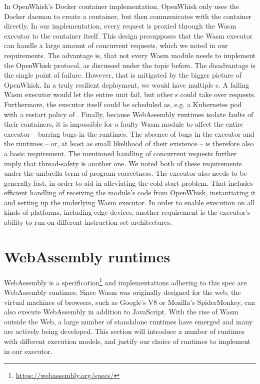 
In OpenWhisk's Docker container implementation, OpenWhisk only uses the Docker daemon to create a container, but then communicates with the container directly. In our implementation, every request is proxied through the Wasm executor to the container itself. This design presupposes that the Wasm executor can handle a large amount of concurrent requests, which we noted in our requirements. The advantage is, that not every Wasm module needs to implement the OpenWhisk protocol, as discussed under the  topic before. The disadvantage is the single point of failure. However, that is mitigated by the bigger picture of OpenWhisk. In a truly resilient deployment, we would have multiple s. A failing Wasm executor would let the entire  unit fail, but other s could take over requests. Furthermore, the executor itself could be scheduled as, e.g. a Kubernetes pod with a restart policy of . Finally, because WebAssembly runtimes isolate faults of their containers, it is impossible for a faulty Wasm module to affect the entire executor -- barring bugs in the runtimes. The absence of bugs in the executor and the runtimes -- or, at least as small likelihood of their existence -- is therefore also a basic requirement. The mentioned handling of concurrent requests further imply that thread-safety is another one. We noted both of these requirements under the umbrella term of program correctness.
The executor also needs to be generally fast, in order to aid in alleviating the cold start problem. That includes efficient handling of receiving the module's code from OpenWhisk, instantiating it and setting up the underlying Wasm executor. In order to enable execution on all kinds of platforms, including edge devices, another requirement is the executor's ability to run on different instruction set architectures.

\section{WebAssembly runtimes}
\label{section:wasm-runtimes}

WebAssembly is a specification\footnote{\url{https://webassembly.org/specs/}} and implementations adhering to this spec are WebAssembly runtimes. Since Wasm was originally designed for the web, the virtual machines of browsers, such as Google's V8 or Mozilla's SpiderMonkey, can also execute WebAssembly in addition to JavaScript. With the rise of Wasm outside the Web, a large number of standalone runtimes have emerged and many are actively being developed. This section will introduce a number of runtimes with different execution models, and justify our choice of runtimes to implement in our executor.


